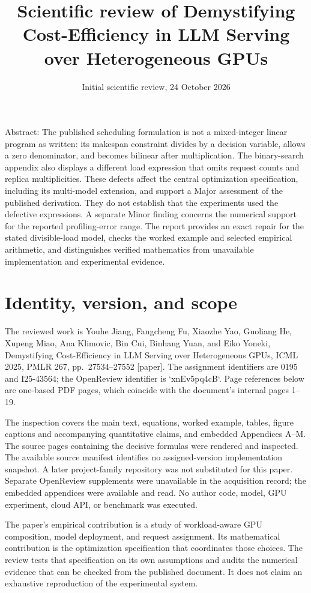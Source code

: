\documentclass[10pt]{article}
\title{Scientific review of
Demystifying Cost-Efficiency in LLM Serving over Heterogeneous GPUs}
\author{}
\date{Initial scientific review, 24 October 2026}
\begin{document}
\maketitle
Abstract: The published scheduling formulation is not a mixed-integer linear program as written: its makespan constraint divides by a decision variable, allows a zero denominator, and becomes bilinear after multiplication. The binary-search appendix also displays a different load expression that omits request counts and replica multiplicities. These defects affect the central optimization specification, including its multi-model extension, and support a Major assessment of the published derivation. They do not establish that the experiments used the defective expressions. A separate Minor finding concerns the numerical support for the reported profiling-error range. The report provides an exact repair for the stated divisible-load model, checks the worked example and selected empirical arithmetic, and distinguishes verified mathematics from unavailable implementation and experimental evidence.\par
\section*{Identity, version, and scope}
The reviewed work is Youhe Jiang, Fangcheng Fu, Xiaozhe Yao, Guoliang He, Xupeng Miao, Ana Klimovic, Bin Cui, Binhang Yuan, and Eiko Yoneki, Demystifying Cost-Efficiency in LLM Serving over Heterogeneous GPUs, ICML 2025, PMLR 267, pp. 27534–27552 [paper]. The assignment identifiers are 0195 and I25-43564; the OpenReview identifier is `xnEv5pq4cB`. Page references below are one-based PDF pages, which coincide with the document’s internal pages 1–19.\par
The inspection covers the main text, equations, worked example, tables, figure captions and accompanying quantitative claims, and embedded Appendices A–M. The source pages containing the decisive formulas were rendered and inspected. The available source manifest identifies no assigned-version implementation snapshot. A later project-family repository was not substituted for this paper. Separate OpenReview supplements were unavailable in the acquisition record; the embedded appendices were available and read. No author code, model, GPU experiment, cloud API, or benchmark was executed.\par
The paper’s empirical contribution is a study of workload-aware GPU composition, model deployment, and request assignment. Its mathematical contribution is the optimization specification that coordinates those choices. The review tests that specification on its own assumptions and audits the numerical evidence that can be checked from the published document. It does not claim an exhaustive reproduction of the experimental system.\par
\end{document}
